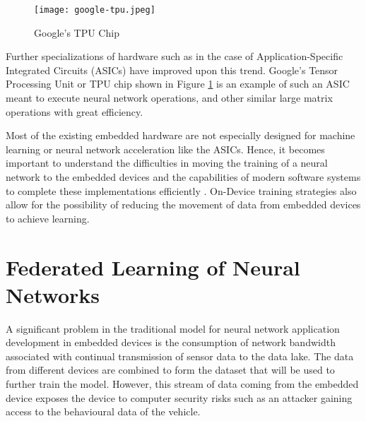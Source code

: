 \begin{figure}[h]
	\centering
	\texttt{[image: google-tpu.jpeg]}
	\caption{Google's TPU Chip}
	\label{fig:google-tpu}
\end{figure}

Further specializations of hardware such as in the case of Application-Specific Integrated Circuits (ASICs) have improved upon this trend. Google's Tensor Processing Unit or TPU chip shown in Figure \ref{fig:google-tpu} is an example of such an ASIC meant to execute neural network operations, and other similar large matrix operations with great efficiency.

Most of the existing embedded hardware are not especially designed for machine learning or neural network acceleration like the ASICs. Hence, it becomes important to understand the difficulties in moving the training of a neural network to the embedded devices and the capabilities of modern software systems to complete these implementations efficiently \cite{zhu2023ondevice}. On-Device training strategies also allow for the possibility of reducing the movement of data from embedded devices to achieve learning.

\section{Federated Learning of Neural Networks}

A significant problem in the traditional model for neural network application development in embedded devices is the consumption of network bandwidth associated with continual transmission of sensor data to the data lake. The data from different devices are combined to form the dataset that will be used to further train the model. However, this stream of data coming from the embedded device exposes the device to computer security risks such as an attacker gaining access to the behavioural data of the vehicle.

\begin{figure}[h]
	\centering
\end{figure}

